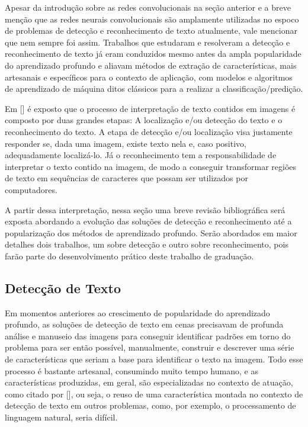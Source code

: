 Apesar da introdução sobre as redes convolucionais na seção anterior e a breve menção que as redes neurais convolucionais são amplamente utilizadas no 
espoco de problemas de detecção e reconhecimento de texto atualmente, vale mencionar que nem sempre foi assim. Trabalhos que estudaram e resolveram a 
detecção e reconhecimento de texto já eram conduzidos mesmo antes da ampla popularidade do aprendizado profundo e aliavam métodos de extração de características, 
mais artesanais e específicos para o contexto de aplicação, com modelos e algoritmos de aprendizado de máquina ditos clássicos para a realizar a classificação/predição.

Em [] é exposto que o processo de interpretação de texto contidos em imagens é composto por duas grandes etapas: A 
localização e/ou detecção do texto e o reconhecimento do texto. A etapa de detecção e/ou localização visa justamente responder se, dada uma imagem, 
existe texto nela e, caso positivo, adequadamente localizá-lo. Já o reconhecimento tem a responsabilidade de interpretar o texto contido na imagem, de 
modo a conseguir transformar regiões de texto em sequências de caracteres que possam ser utilizados por computadores.

A partir dessa interpretação, nessa seção uma breve revisão bibliográfica será exposta abordando a evolução das soluções de detecção e reconhecimento 
até a popularização dos métodos de aprendizado profundo. Serão abordados em maior detalhes dois trabalhos, um sobre detecção e outro sobre reconhecimento, 
pois farão parte do desenvolvimento prático deste trabalho de graduação.


\subsection{Detecção de Texto}
Em momentos anteriores ao crescimento de popularidade do aprendizado profundo, as soluções de detecção de texto em cenas precisavam de profunda 
análise e manuseio das imagens para conseguir identificar padrões em torno do problema para ser então possível, manualmente, construir 
e descrever uma série de características que seriam a base para identificar o texto na imagem. Todo esse processo é bastante artesanal, consumindo muito 
tempo humano, e as características produzidas, em geral, são especializadas no contexto de atuação, como citado por [], 
ou seja, o reuso de uma característica montada no contexto de detecção de texto em outros problemas, como, por exemplo, o processamento de linguagem natural, 
seria difícil.

